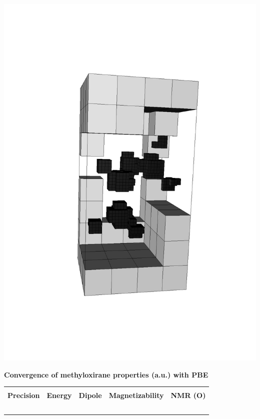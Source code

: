 \begin{frame}
\begin{minipage}{0.5\textwidth}
\includegraphics[angle=-90, scale=0.25, viewport = 170 150 470 700, clip]{figures/methyloxirane_grid.pdf}
\end{minipage}
\begin{table}
    \centering
    \textbf{Convergence of methyloxirane properties (a.u.) with PBE}
    \begin{tabular}{ccccc}
    \hline               
    \hline               
                   &                        &                 &                          &                  \\
\textbf{Precision} & \textbf{Energy}        & \textbf{Dipole} & \textbf{Magnetizability} & \textbf{NMR (O)} \\
    \hspace{10mm}\ & \hspace{20mm}\         & \hspace{15mm}\  & \hspace{15mm}\           & \hspace{15mm}\   \\

\end{tabular}
\end{table}
\end{frame}
